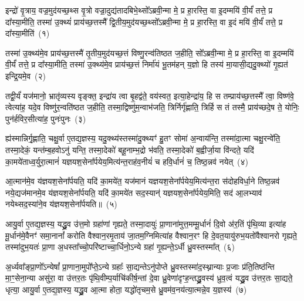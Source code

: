 \setcounter{anuvakam}{0}
इन्द्रो॑ वृ॒त्राय॒ वज्र॒मुद॑यच्छ॒थ्स वृ॒त्रो वज्रा॒दुद्य॑तादबिभे॒थ्सो᳚\-ऽब्रवी॒न्मा मे॒ प्र हा॒रस्ति॒ वा इ॒दम्मयि॑ वी॒र्यं॑ तत्ते॒ प्र दा᳚स्या॒मीति॒ तस्मा॑ उ॒क्थ्यं॑ प्राय॑च्छ॒त्तस्मै᳚ द्वि॒तीय॒मुद॑यच्छ॒थ्सो᳚\-ऽब्रवी॒न्मा मे॒ प्र हा॒रस्ति॒ वा इ॒दं मयि॑ वी॒र्यं॑ तत्ते॒ प्र दा᳚स्या॒मीति॑~(१)

तस्मा॑ उ॒क्थ्य॑मे॒व प्राय॑च्छ॒त्तस्मै॑ तृ॒तीय॒मुद॑यच्छ॒त्तं विष्णु॒रन्व॑तिष्ठत ज॒हीति॒ सो᳚\-ऽब्रवी॒न्मा मे॒ प्र हा॒रस्ति॒ वा इ॒दम्मयि॑ वी॒र्यं॑ तत्ते॒ प्र दा᳚स्या॒मीति॒ तस्मा॑ उ॒क्थ्य॑मे॒व प्राय॑च्छ॒त्तं निर्मा॑यं भू॒तम॑हन् य॒ज्ञो हि तस्य॑ मा॒यासी॒द्यदु॒क्थ्यो॑ गृ॒ह्यत॑ इन्द्रि॒यमे॒व~(२)

तद्वी॒र्यं॑ यज॑मानो॒ भ्रातृ॑व्यस्य वृङ्क्त॒ इन्द्रा॑य त्वा बृ॒हद्व॑ते॒ वय॑स्वत॒ इत्या॒हेन्द्रा॑य॒ हि स तम्प्राय॑च्छ॒त्तस्मै᳚ त्वा॒ विष्ण॑वे॒ त्वेत्या॑ह॒ यदे॒व विष्णु॑र॒न्वति॑ष्ठत ज॒हीति॒ तस्मा॒द्विष्णु॑म॒न्वाभ॑जति॒ त्रिर्निर्गृ॑ह्णाति॒ त्रिर्\mbox{}हि स तं तस्मै॒ प्राय॑च्छदे॒ष ते॒ योनिः॒ पुन॑र्\mbox{}हविर॒सीत्या॑ह॒ पुनः॑पुनः~(३)

ह्य॑स्मान्निर्गृ॒ह्णाति॒ चक्षु॒र्वा ए॒तद्य॒ज्ञस्य॒ यदु॒क्थ्य॑स्तस्मा॑दु॒क्थ्यꣳ॑ हु॒तꣳ सोमा॑ अ॒न्वाय॑न्ति॒ तस्मा॑दा॒त्मा चक्षु॒रन्वे॑ति॒ तस्मा॒देकं॒ यन्त॑म्ब॒हवो\-ऽनु॑ यन्ति॒ तस्मा॒देको॑ बहू॒नाम्भ॒द्रो भ॑वति॒ तस्मा॒देको॑ ब॒ह्वीर्जा॒या वि॑न्दते॒ यदि॑ का॒मये॑ताध्व॒र्युरा॒त्मानं॑ यज्ञयश॒सेना᳚र्पयेय॒मित्य॑न्त॒राह॑व॒नीयं॑ च हवि॒र्धानं॑ च॒ तिष्ठ॒न्नव॑ नयेत्~(४)

आ॒त्मान॑मे॒व य॑ज्ञयश॒सेना᳚र्पयति॒ यदि॑ का॒मये॑त॒ यज॑मानं यज्ञयश॒सेना᳚र्पयेय॒मित्य॑न्त॒रा स॑दोहविर्धा॒ने तिष्ठ॒न्नव॑ नये॒द्यज॑मानमे॒व य॑ज्ञयश॒सेना᳚र्पयति॒ यदि॑ का॒मये॑त सद॒स्यान्॑ यज्ञयश॒सेना᳚र्पयेय॒मिति॒ सद॑ आ॒लभ्याव॑ नयेथ्सद॒स्या॑ने॒व य॑ज्ञयश॒सेना᳚र्पयति॥~(५)

{\anuvakamend[{इती᳚न्द्रि॒यमे॒व पुनः॑पुनर्नये॒त्त्रय॑स्त्रिꣳशच्च}]}%

आयु॒र्वा ए॒तद्य॒ज्ञस्य॒ यद्ध्रु॒व उ॑त्त॒मो ग्रहा॑णां गृह्यते॒ तस्मा॒दायुः॑ प्रा॒णाना॑मुत्त॒मम्मू॒र्धानं॑ दि॒वो अ॑र॒तिं पृ॑थि॒व्या इत्या॑ह मू॒र्धान॑मे॒वैनꣳ॑ समा॒नानां᳚ करोति वैश्वान॒रमृ॒ताय॑ जा॒तम॒ग्निमित्या॑ह वैश्वान॒रꣳ हि दे॒वत॒यायु॑रुभ॒यतो॑वैश्वानरो गृह्यते॒ तस्मा॑दुभ॒यतः॑ प्रा॒णा अ॒धस्ता᳚च्चो॒परि॑ष्टाच्चा॒र्धिनो॒\-ऽन्ये ग्रहा॑ गृ॒ह्यन्ते॒\-ऽर्धी ध्रु॒वस्तस्मा᳚त्~(६)

अ॒र्ध्यवा᳚ङ्प्रा॒णो᳚\-ऽन्येषां᳚ प्रा॒णाना॒मुपो᳚प्ते॒\-ऽन्ये ग्रहाः᳚ सा॒द्यन्ते\-ऽनु॑पोप्ते ध्रु॒वस्तस्मा॑द॒स्थ्नान्याः प्र॒जाः प्र॑ति॒तिष्ठ॑न्ति मा॒ꣳ॒सेना॒न्या असु॑रा॒ वा उ॑त्तर॒तः पृ॑थि॒वीम्प॒र्याचि॑कीर्\mbox{}ष॒न्तां दे॒वा ध्रु॒वेणा॑दृꣳह॒न्तद्ध्रु॒वस्य॑ ध्रुव॒त्वं यद्ध्रु॒व उ॑त्तर॒तः सा॒द्यते॒ धृत्या॒ आयु॒र्वा ए॒तद्य॒ज्ञस्य॒ यद्ध्रु॒व आ॒त्मा होता॒ यद्धो॑तृचम॒से ध्रु॒वम॑व॒नय॑त्या॒त्मन्ने॒व य॒ज्ञस्य॑~(७)

